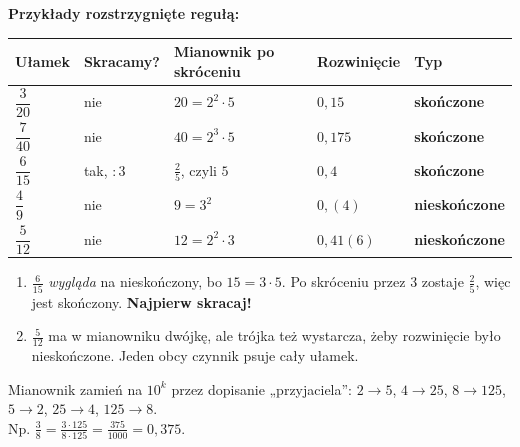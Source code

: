 \documentclass[11pt,a4paper]{article}
\begin{document}
\vspace{0.1em}
\textbf{Przykłady rozstrzygnięte regułą:}
\renewcommand{\arraystretch}{1.15}
\begin{center}
\begin{tabular}{@{}lllll@{}}
\toprule
Ułamek & Skracamy? & Mianownik po skróceniu & Rozwinięcie & Typ \\
\midrule
$\dfrac{3}{20}$ & nie & $20 = 2^{2}\cdot 5$ & $0{,}15$ & \textcolor{skonczony}{\textbf{skończone}} \\
$\dfrac{7}{40}$ & nie & $40 = 2^{3}\cdot 5$ & $0{,}175$ & \textcolor{skonczony}{\textbf{skończone}} \\
$\dfrac{6}{15}$ & tak, $:3$ & $\frac{2}{5}$, czyli $5$ & $0{,}4$ & \textcolor{skonczony}{\textbf{skończone}} \\
$\dfrac{4}{9}$ & nie & $9 = 3^{2}$ & $0{,}(4)$ & \textcolor{okres}{\textbf{nieskończone}} \\
$\dfrac{5}{12}$ & nie & $12 = 2^{2}\cdot 3$ & $0{,}41(6)$ & \textcolor{okres}{\textbf{nieskończone}} \\
\bottomrule
\end{tabular}
\end{center}

\begin{pulapka}
\begin{enumerate}[leftmargin=*, itemsep=2pt]
  \item $\frac{6}{15}$ \emph{wygląda} na nieskończony, bo $15 = 3\cdot 5$. Po skróceniu przez $3$ zostaje $\frac{2}{5}$, więc jest skończony. \textbf{Najpierw skracaj!}
  \item $\frac{5}{12}$ ma w mianowniku dwójkę, ale trójka też wystarcza, żeby rozwinięcie było nieskończone. Jeden obcy czynnik psuje cały ułamek.
\end{enumerate}
\end{pulapka}

\begin{regula}
Mianownik zamień na $10^{k}$ przez dopisanie „przyjaciela”: $2\to 5$, $4\to 25$, $8\to 125$, $5\to 2$, $25\to 4$, $125\to 8$.\\
Np. $\displaystyle\frac{3}{8} = \frac{3\cdot 125}{8\cdot 125} = \frac{375}{1000} = 0{,}375$.
\end{regula}
\end{document}
